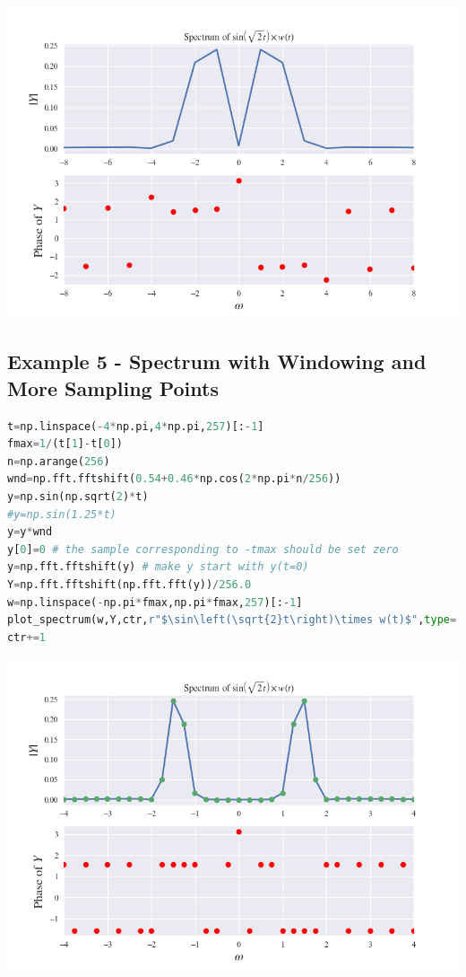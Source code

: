 \documentclass[12pt]{article}
\begin{document}
\begin{center}
    \includegraphics[scale=0.8]{images/fig7.png}
\end{center}
\pagebreak

\subsection{Example 5 - Spectrum with Windowing and More Sampling Points}
\begin{lstlisting}[language=Python]
t=np.linspace(-4*np.pi,4*np.pi,257)[:-1]
fmax=1/(t[1]-t[0])
n=np.arange(256)
wnd=np.fft.fftshift(0.54+0.46*np.cos(2*np.pi*n/256))
y=np.sin(np.sqrt(2)*t)
#y=np.sin(1.25*t)
y=y*wnd
y[0]=0 # the sample corresponding to -tmax should be set zero
y=np.fft.fftshift(y) # make y start with y(t=0)
Y=np.fft.fftshift(np.fft.fft(y))/256.0
w=np.linspace(-np.pi*fmax,np.pi*fmax,257)[:-1]
plot_spectrum(w,Y,ctr,r"$\sin\left(\sqrt{2}t\right)\times w(t)$",type='linpts',xlims=[-4,4])
ctr+=1
\end{lstlisting}

\begin{center}
    \includegraphics[scale=0.8]{images/fig8.png}
\end{center}
\pagebreak
\end{document}
